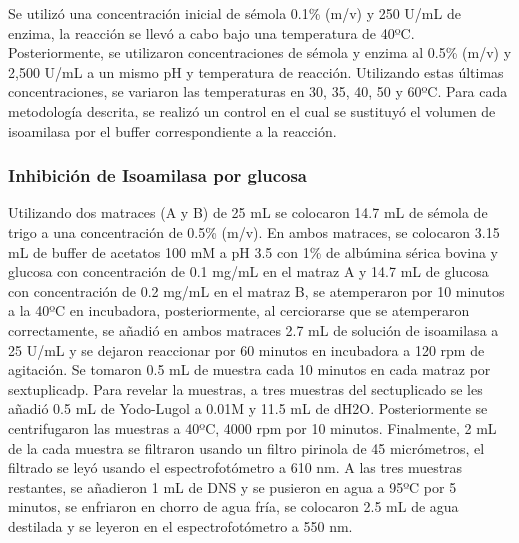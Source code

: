 \documentclass{article}
\begin{document}
Se utilizó una concentración inicial de sémola 0.1\% (m/v) y 250 U/mL de enzima, la reacción se llevó a cabo bajo una temperatura de 40ºC. Posteriormente, se utilizaron concentraciones de sémola y enzima al 0.5\% (m/v) y 2,500 U/mL a un mismo pH y temperatura de reacción. Utilizando estas últimas concentraciones, se variaron las temperaturas en 30, 35, 40, 50 y 60ºC. Para cada metodología descrita, se realizó un control en el cual se sustituyó el volumen de isoamilasa por el buffer correspondiente a la reacción.

\subsubsection{Inhibición de Isoamilasa por glucosa}

Utilizando dos matraces (A y B) de 25 mL se colocaron 14.7 mL de sémola de trigo a una concentración de 0.5\% (m/v). En ambos matraces, se colocaron 3.15 mL de buffer de acetatos 100 mM a pH 3.5 con 1\% de albúmina sérica bovina y glucosa con concentración de 0.1 mg/mL en el matraz A y 14.7 mL de glucosa con concentración de 0.2 mg/mL en el matraz B, se atemperaron por 10 minutos a la 40ºC en incubadora, posteriormente, al cerciorarse que se atemperaron correctamente, se añadió en ambos matraces 2.7 mL de solución de isoamilasa a 25 U/mL y se dejaron reaccionar por 60 minutos en incubadora a 120 rpm de agitación. Se tomaron 0.5 mL de muestra cada 10 minutos en cada matraz por sextuplicadp. Para revelar la muestras, a tres muestras del sectuplicado se les añadió 0.5 mL de Yodo-Lugol a 0.01M y 11.5 mL de dH2O. Posteriormente se centrifugaron las muestras a 40ºC, 4000 rpm por 10 minutos. Finalmente,  2 mL de la cada muestra se filtraron usando un filtro pirinola de 45 micrómetros, el filtrado se leyó usando el espectrofotómetro a 610 nm. A las tres muestras restantes, se añadieron 1 mL de DNS y se pusieron en agua a 95ºC por 5 minutos, se enfriaron en chorro de agua fría, se colocaron 2.5 mL de agua destilada y se leyeron en el espectrofotómetro a 550 nm.  
\end{document}

